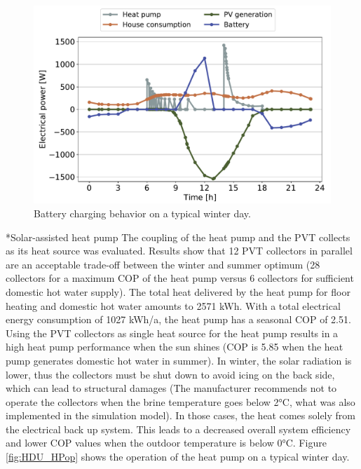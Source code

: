 \documentclass[twocolumn, a4paper,10pt]{article}
\makeatletter
\renewcommand\subsection{\@startsection{subsection}{1}{\z@}{\z@}{\z@}{\normalfont\normalsize\bfseries}}
\renewcommand\subsection{\@startsection{subsection}{1}{\z@}{\z@}{0.1pt}{\normalfont\normalsize\bfseries}}
\makeatother
\begin{document}
\begin{figure}[ht]
\vspace{-5pt} 
\centering
\includegraphics[scale=0.34]{img/HDU_ELbal.pdf}
\caption{Battery charging behavior on a typical winter day.}
\label{fig:HDU_ELbal}
\end{figure}

\subsection*{Solar-assisted heat pump}
The coupling of the heat pump and the PVT collects as its heat source was evaluated. Results show that 12 PVT collectors in parallel are an acceptable trade-off between the winter and summer optimum (28 collectors for a maximum COP of the heat pump versus 6 collectors for sufficient domestic hot water supply). The total heat delivered by the heat pump for floor heating and domestic hot water amounts to 2571 kWh. With a total electrical energy consumption of 1027 kWh/a, the heat pump has a seasonal COP of 2.51. Using the PVT collectors as single heat source for the heat pump results in a high heat pump performance when the sun shines (COP is 5.85 when the heat pump generates domestic hot water in summer). In winter, the solar radiation is lower, thus the collectors must be shut down to avoid icing on the back side, which can lead to structural damages (The manufacturer recommends not to operate the collectors when the brine temperature goes below 2°C, what was also implemented in the simulation model). In those cases, the heat comes solely from the electrical back up system. This leads to a decreased overall system efficiency and lower COP values when the outdoor temperature is below 0°C. Figure \ref{fig:HDU_HPop} shows the operation of the heat pump on a typical winter day.
\end{document}
